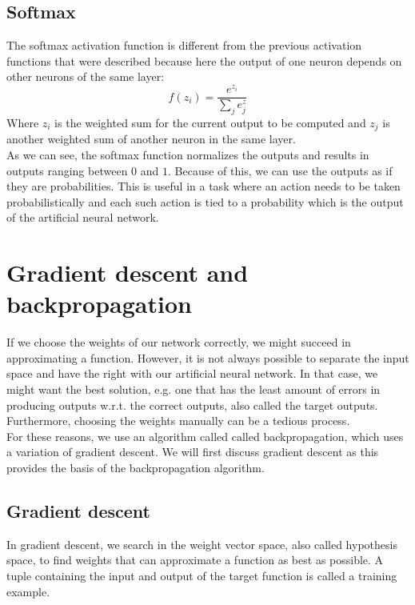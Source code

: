 \subsection{Softmax} %
\label{sub:softmax}
The softmax activation function is different from the previous activation functions that were described because here the output of one neuron depends on other neurons of the same layer:
\begin{equation}
    f(z_i) = \frac{e^{z_i}}{\sum_j e{^z_j}}
\end{equation}
Where $z_i$ is the weighted sum for the current output to be computed and $z_j$ is another weighted sum of another neuron in the same layer.\\
 As we can see, the softmax function normalizes the outputs and results in outputs ranging between $0$ and $1$. Because of this, we can use the outputs as if they are probabilities. This is useful in a task where an action needs to be taken probabilistically and each such action is tied to a probability which is the output of the artificial neural network.

\section{Gradient descent and backpropagation} %
\label{sec:gradient_descent_and_backpropagation}
If we choose the weights of our network correctly, we might succeed in approximating a function.
However, it is not always possible to separate the input space and have the right with our artificial neural network.
In that case, we might want the best solution, e.g. one that has the least amount of errors in producing outputs w.r.t. the correct outputs, also called the target outputs. Furthermore, choosing the weights manually can be a tedious process.\\
For these reasons, we use an algorithm called called backpropagation, which uses a variation of gradient descent. We will first discuss gradient descent as this provides the basis of the backpropagation algorithm.

\subsection{Gradient descent} %
\label{ssub:gradient_descent}
In gradient descent, we search in the weight vector space, also called hypothesis space, to find weights that can approximate a function as best as possible. A tuple containing the input and output of the target function is called a training example.

